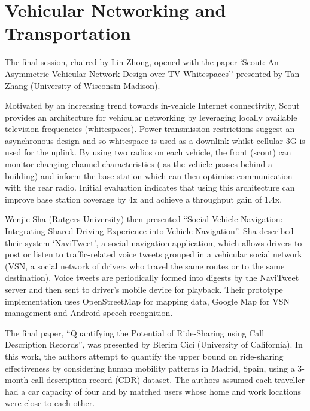 \section{Vehicular Networking and Transportation}
\label{sec:vehiclenets}

The final session, chaired by Lin Zhong, opened with the paper `Scout: An 
Asymmetric Vehicular Network Design over TV Whitespaces'' presented by Tan Zhang 
(University of Wisconsin Madison).

Motivated by an increasing trend towards in-vehicle Internet connectivity, Scout 
provides an architecture for vehicular networking by leveraging locally available 
television frequencies (whitespaces). Power transmission restrictions suggest an 
asynchronous design and so whitespace is used as a downlink whilst cellular 3G is 
used for the uplink. By using two radios on each vehicle, the front (scout) can 
monitor changing channel characteristics (\eg{} as the vehicle passes behind a 
building) and inform the base station which can then optimise communication with 
the rear radio. Initial evaluation indicates that using this architecture can 
improve base station coverage by 4x and achieve a throughput gain of 1.4x.

Wenjie Sha (Rutgers University) then presented ``Social Vehicle Navigation: 
Integrating Shared Driving Experience into Vehicle Navigation''. Sha described 
their system `NaviTweet', a social navigation application, which allows drivers 
to post or listen to traffic-related voice tweets grouped in a vehicular social 
network (VSN, a social network of drivers who travel the same routes or to the 
same destination). Voice tweets are periodically formed into digests by the 
NaviTweet server and then sent to driver's mobile device for playback. Their 
prototype implementation uses OpenStreetMap for mapping data, Google Map for VSN 
management and Android speech recognition.

The final paper, ``Quantifying the Potential of Ride-Sharing using Call 
Description Records'', was presented by Blerim Cici (University of California). 
In this work, the authors attempt to quantify the upper bound on ride-sharing 
effectiveness by considering human mobility patterns in Madrid, Spain, using a
3-month call description record (CDR) dataset. The authors assumed each traveller 
had a car capacity of four and by matched users whose home and work locations 
were close to each other.